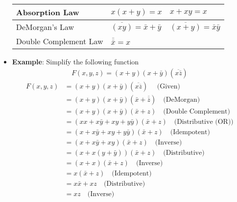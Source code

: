 \documentclass{report}
\begin{document}
\begin{itemize}
\begin{center}
\begin{tabular}{|l|l|l|}
                    Absorption Law               & $x(x + y) = x$                 & $x + xy = x$ \\ \hline
                    DeMorgan's Law               & $\overline{(xy)} = \bar{x} + \bar{y}$ & $\overline{(x + y)} = \bar{x}\bar{y}$ \\ \hline
                    Double Complement Law        & $\bar{\bar{x}} = x$            &  \\ \hline
                \end{tabular}
            \end{center}
        \item \textbf{Example}: Simplify the following function
            \begin{align*}
                F(x,y,z) = (x+y)(x+\bar{y})(\overline{x \bar{z}})
            \end{align*}
            \begin{align*}
                F(x,y,z) &= (x+y)(x+ \bar{y})(\overline{x \overline{z}}) \quad \text{ (Given)} \\
                         &= (x+y)(x+ \bar{y})( \bar{x} + \overline{ \overline{z}}) \quad \text{(DeMorgan)} \\
                         &= (x+y)(x+ \bar{y})( \bar{x} +  z) \quad \text{(Double Complement)} \\
                         &= (xx + x \bar{y} + xy + y \bar{y})( \bar{x} + z) \quad \text{(Distributive (OR))} \\
                         &= (x + x \bar{y} + xy + y \bar{y})( \bar{x} + z) \quad \text{(Idempotent)} \\ 
                         &= (x + x \bar{y} + xy)( \bar{x} + z) \quad \text{(Inverse)} \\
                         &= (x + x (y + \bar{y}))( \bar{x} + z) \quad \text{(Distributive)} \\
                         &= (x + x)( \bar{x} + z) \quad \text{(Inverse)} \\
                         &= x( \bar{x} + z) \quad \text{(Idempotent)} \\
                         &= x \bar{x} + xz \quad \text{(Distributive)} \\
                         &=  xz \quad \text{(Inverse)}
            \end{align*}

    \end{itemize}

    \pagebreak 
\end{document}
